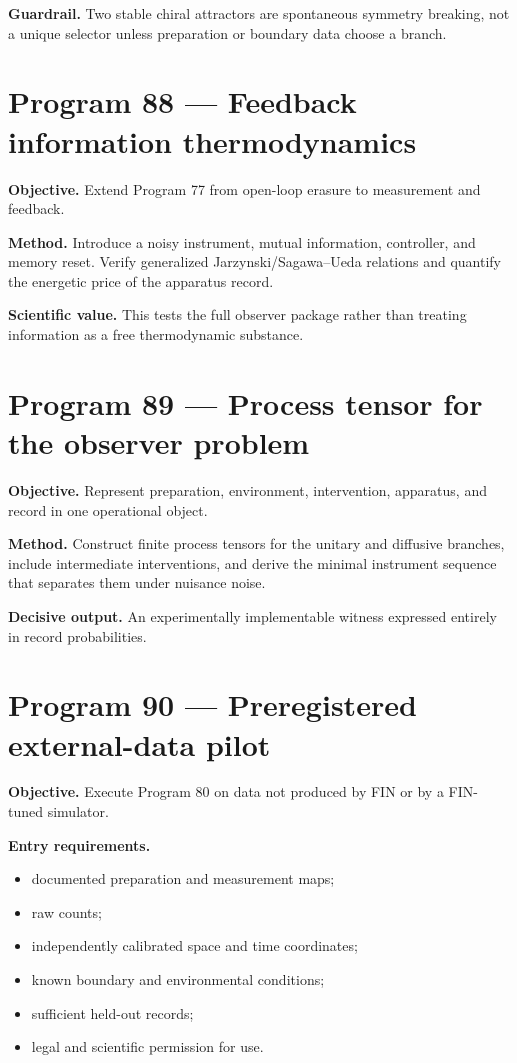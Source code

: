 \documentclass[11pt,a4paper,openany]{report}
\begin{document}
\textbf{Guardrail.} Two stable chiral attractors are spontaneous symmetry breaking, not a unique selector unless preparation or boundary data choose a branch.

\section{Program 88 --- Feedback information thermodynamics}

\textbf{Objective.} Extend Program 77 from open-loop erasure to measurement and feedback.

\textbf{Method.} Introduce a noisy instrument, mutual information, controller, and memory reset. Verify generalized Jarzynski/\allowbreak{}Sagawa--Ueda relations and quantify the energetic price of the apparatus record.

\textbf{Scientific value.} This tests the full observer package rather than treating information as a free thermodynamic substance.

\section{Program 89 --- Process tensor for the observer problem}

\textbf{Objective.} Represent preparation, environment, intervention, apparatus, and record in one operational object.

\textbf{Method.} Construct finite process tensors for the unitary and diffusive branches, include intermediate interventions, and derive the minimal instrument sequence that separates them under nuisance noise.

\textbf{Decisive output.} An experimentally implementable witness expressed entirely in record probabilities.

\section{Program 90 --- Preregistered external-data pilot}

\textbf{Objective.} Execute Program 80 on data not produced by FIN or by a FIN-tuned simulator.

\textbf{Entry requirements.}

\begin{itemize}
\item 
documented preparation and measurement maps;

\item 
raw counts;

\item 
independently calibrated space and time coordinates;

\item 
known boundary and environmental conditions;

\item 
sufficient held-out records;

\item 
legal and scientific permission for use.

\end{itemize}
\end{document}
